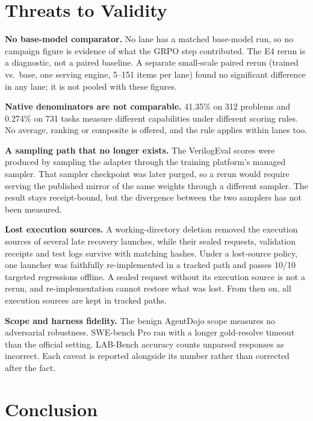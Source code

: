 \documentclass[runningheads]{llncs}
\begin{document}
\section{Threats to Validity}

\textbf{No base-model comparator.} No lane has a matched base-model run, so no
campaign figure is evidence of what the GRPO step contributed. The E4 rerun
is a diagnostic, not a paired baseline. A separate small-scale paired rerun
(trained vs.\ base, one serving engine, 5--151 items per lane) found no
significant difference in any lane; it is not pooled with these figures.

\textbf{Native denominators are not comparable.} 41.35\% on 312 problems and
0.274\% on 731 tasks measure different capabilities under different scoring
rules. No average, ranking or composite is offered, and the rule applies
within lanes too.

\textbf{A sampling path that no longer exists.} The VerilogEval scores were
produced by sampling the adapter through the training platform's managed
sampler. That sampler checkpoint was later purged, so a rerun would require
serving the published mirror of the same weights through a different sampler.
The result stays receipt-bound, but the divergence between the two samplers
has not been measured.

\textbf{Lost execution sources.} A working-directory deletion removed the
execution sources of several late recovery launches, while their sealed
requests, validation receipts and test logs survive with matching hashes. Under
a lost-source policy, one launcher was faithfully re-implemented in a tracked
path and passes 10/10 targeted regressions offline. A sealed request without
its execution source is not a rerun, and re-implementation cannot restore what
was lost. From then on, all execution sources are kept in tracked paths.

\textbf{Scope and harness fidelity.} The benign AgentDojo scope measures no
adversarial robustness. SWE-bench Pro ran with a longer gold-resolve timeout
than the official setting. LAB-Bench accuracy counts unparsed responses as
incorrect. Each caveat is reported alongside its number rather than corrected
after the fact.

\section{Conclusion}
\end{document}
